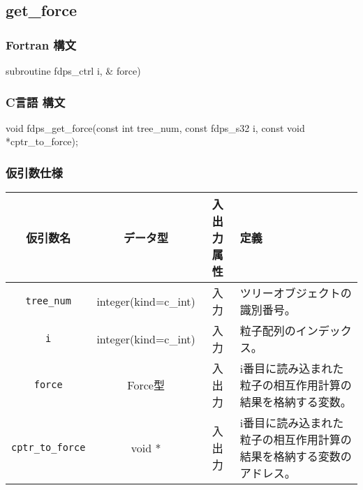 \clearpage

\subsection{get\_force}
\subsubsection*{Fortran 構文}
\begin{screen}
\begin{spverbatim}  
subroutine fdps_ctrl%
                               i, &
                               force)
\end{spverbatim}
\end{screen}

\subsubsection*{C言語 構文}
\begin{screen}
\begin{spverbatim}  
void fdps_get_force(const int tree_num,                                                             
                    const fdps_s32 i,                                                               
                    const void *cptr_to_force);
\end{spverbatim}
\end{screen}

\subsubsection*{仮引数仕様}
\begin{table}[h]
\begin{tabularx}{\linewidth}{cccX}
\toprule
\rowcolor{Snow2}
仮引数名 & データ型 & 入出力属性 & 定義 \\
\midrule
\verb|tree_num| & integer(kind=c\_int) & 入力 & ツリーオブジェクトの識別番号。\\
\verb|i| & integer(kind=c\_int) & 入力 & 粒子配列のインデックス。\\
\verb|force| & Force型 & 入出力 & i番目に読み込まれた粒子の相互作用計算の結果を格納する変数。\\
\verb|cptr_to_force| & void * & 入出力 & i番目に読み込まれた粒子の相互作用計算の結果を格納する変数のアドレス。\\
\bottomrule
\end{tabularx}
\end{table}

